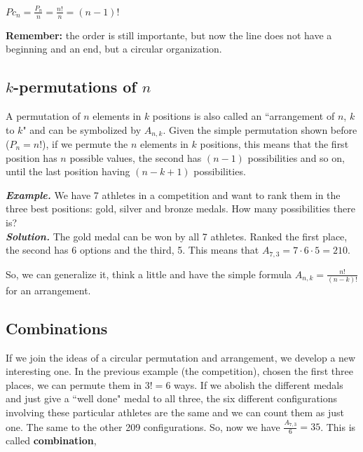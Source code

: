 \documentclass[a4paper,twocolumn]{article}
\begin{document}
\begin{center}
$Pc_n = \frac{P_n}{n} = \frac{n!}{n} = (n - 1)!$
\end{center}

\noindent\textbf{Remember:} the order is still importante, but now the line does not have a beginning and an end, but a circular organization.


\subsection{$k$-permutations of $n$}
\label{subsec:arrang}

A permutation of $n$ elements in $k$ positions is also called an ``arrangement of $n$, $k$ to $k$" and can be symbolized by $A_{n,k}$. Given the simple permutation shown before ($P_n = n!$), if we permute the $n$ elements in $k$ positions, this means that the first position has $n$ possible values, the second has $(n -1)$ possibilities and so on, until the last position having $(n - k + 1)$ possibilities.

\bigskip

\noindent\textbf{\textit{Example.}} We have 7 athletes in a competition and want to rank them in the three best positions: gold, silver and bronze medals. How many possibilities there is?\\
\noindent\textbf{\textit{Solution.}} The gold medal can be won by all 7 athletes. Ranked the first place, the second has 6 options and the third, 5. This means that $A_{7,3} = 7 \cdot 6 \cdot 5 = 210$.

\bigskip

\noindent So, we can generalize it, think a little and have the simple formula $A_{n,k} = \frac{n!}{(n - k)!}$ for an arrangement.


\subsection{Combinations}
\label{subsec:comb}

If we join the ideas of a circular permutation and arrangement, we develop a new interesting one. In the previous example (the competition), chosen the first three places, we can permute them in $3! = 6$ ways. If we abolish the different medals and just give a ``well done" medal to all three, the six different configurations involving these particular athletes are the same and we can count them as just one. The same to the other 209 configurations. So, now we have $\frac{A_{7,3}}{6} = 35$. This is called \textbf{combination},
\end{document}
